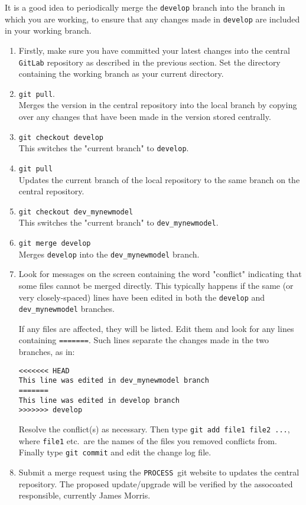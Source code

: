 \documentclass[11pt,a4paper]{report}
\newcommand{\process}{\mbox{\texttt{PROCESS}}}
\begin{document}
It is a good idea to periodically merge the \texttt{develop} branch into the branch in which you are working, to ensure that any changes made in \texttt{develop} are included in your working branch.
\begin{enumerate}

\item Firstly, make sure you have committed your latest changes into the
  central \texttt{GitLab} repository as described in the previous section.  Set the directory containing the working branch as your current directory.

\item \texttt{git pull}.  \\
Merges the version in the central repository into the local branch by copying over any changes that have been made in the version stored centrally.

\item \texttt{git checkout develop}  \\
This switches the "current branch" to \texttt{develop}.

\item \texttt{git pull} \\
Updates the current branch of the local repository to the same branch on the central repository.

\item \texttt{git checkout dev\_mynewmodel}  \\
This switches the "current branch" to \texttt{dev\_mynewmodel}.

\item \texttt{git merge develop} \\
Merges \texttt{develop} into the \texttt{dev\_mynewmodel} branch.

\item Look for messages on the screen containing the word "conflict" indicating that some files cannot be merged directly. This typically happens if the
  same (or very closely-spaced) lines have been edited in both the
  \texttt{develop} and \texttt{dev\_mynewmodel} branches.

  If any files are affected, they will be listed.  Edit them and look for any lines containing  \texttt{=======}. Such lines separate the changes made in the two branches, as in:
\begin{verbatim}
<<<<<<< HEAD
This line was edited in dev_mynewmodel branch
=======
This line was edited in develop branch
>>>>>>> develop
\end{verbatim}
  Resolve the conflict(s) as necessary. Then type \texttt{git add file1 file2 ...}, where
  \texttt{file1} etc.\ are the names of the files you removed conflicts
  from. Finally type \texttt{git commit} and edit the change log file.

\item Submit a merge request using the \process\ git website to updates the central repository. The proposed update/upgrade will be verified by the assocoated responsible, currently James Morris.

\end{enumerate}
\end{document}
